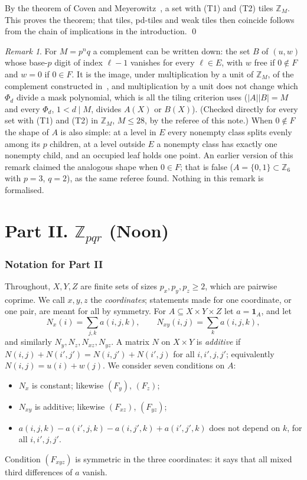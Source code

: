 \documentclass[11pt,a4paper]{amsart}
\theoremstyle{definition}
\theoremstyle{remark}
\newtheorem{remark}[theorem]{Remark}
\newcommand{\Z}{\mathbb{Z}}
\newcommand{\one}{\mathbf{1}}
\begin{document}
By the theorem of Coven and Meyerowitz~\cite{CM}, a set with (T1) and (T2) tiles $\Z_M$. This proves the
theorem; that tiles, pd-tiles and weak tiles then coincide follows from the chain of implications in the introduction. \qed

\begin{remark}
For $M=p^nq$ a complement can be written down: the set $B$ of $(u,w)$ whose base-$p$ digit of index $\ell-1$
vanishes for every $\ell\in E$, with $w$ free if $0\notin F$ and $w=0$ if $0\in F$. It is the image, under
multiplication by a unit of $\Z_M$, of the complement constructed in~\cite{CM}, and multiplication by a unit
does not change which $\Phi_d$ divide a mask polynomial, which is all the tiling criterion uses
($|A||B|=M$ and every $\Phi_d$, $1<d\mid M$, divides $A(X)$ or $B(X)$). (Checked directly for every set with (T1) and (T2)
in $\Z_M$, $M\le 28$, by the referee of this note.) When $0\notin F$ the shape of $A$ is also simple: at a
level in $E$ every nonempty class splits evenly among its $p$ children, at a level outside $E$ a nonempty
class has exactly one nonempty child, and an occupied leaf holds one point. An earlier version of this
remark claimed the analogous shape when $0\in F$; that is false ($A=\{0,1\}\subset\Z_6$ with $p=3$,
$q=2$), as the same referee found. Nothing in this remark is formalised.
\end{remark}


\part*{Part II. \texorpdfstring{$\Z_{pqr}$}{Z\_{pqr}} (Noon)}

\section{Notation for Part II}\label{N:sec:notation}

Throughout, $X,Y,Z$ are finite sets of sizes $p_x,p_y,p_z\ge 2$, which are pairwise coprime. We call $x,y,z$ the
\emph{coordinates}; statements made for one coordinate, or one pair, are meant for all by symmetry. For
$A\subseteq X\times Y\times Z$ let $a=\one_A$, and let
\[
 N_x(i)=\sum_{j,k}a(i,j,k),\qquad N_{xy}(i,j)=\sum_k a(i,j,k),
\]
and similarly $N_y,N_z,N_{xz},N_{yz}$. A matrix $N$ on $X\times Y$ is \emph{additive} if
$N(i,j)+N(i',j')=N(i,j')+N(i',j)$ for all $i,i',j,j'$; equivalently $N(i,j)=u(i)+w(j)$. We consider seven
conditions on $A$:
\begin{itemize}
\item[$(F_x)$] $N_x$ is constant; likewise $(F_y)$, $(F_z)$;
\item[$(F_{xy})$] $N_{xy}$ is additive; likewise $(F_{xz})$, $(F_{yz})$;
\item[$(F_{xyz})$] $a(i,j,k)-a(i',j,k)-a(i,j',k)+a(i',j',k)$ does not depend on $k$, for all $i,i',j,j'$.
\end{itemize}
Condition $(F_{xyz})$ is symmetric in the three coordinates: it says that all mixed third differences of $a$ vanish.
\end{document}

